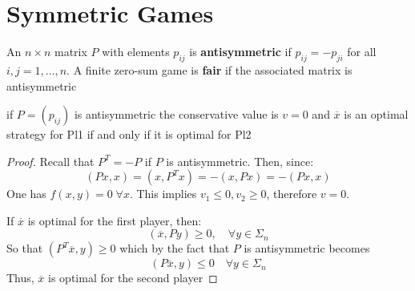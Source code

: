 \documentclass[../main.tex]{subfiles}
\begin{document}
\section{Symmetric Games}
\begin{definition}
    An $n \times n$ matrix $P$ with elements $p_{ij}$ is \textbf{antisymmetric} if $p_{ij} = - p_{ji}$ for all $i,j = 1,\ldots,n$. A finite zero-sum game is \textbf{fair} if the associated matrix is antisymmetric
\end{definition}

\begin{proposition}
    if $P = (p_{ij})$ is antisymmetric the conservative value is $v = 0$ and $\overline{x}$ is an optimal strategy for Pl1 if and only if it is optimal for Pl2
\end{proposition}

\begin{proof}
    Recall that  $P^T = - P$ if $P$ is antisymmetric. Then, since:
    \[
        (Px,x) = (x, P^T x) = - (x, Px) = -(Px,x)
    \]
    One has $f(x,y)=0 \; \forall x$. This implies $v_1 \leq 0, v_2 \geq 0$, therefore $v = 0$.

    If $\overline{x}$ is optimal for the first player, then:
    \[
        (\overline{x}, Py) \geq 0, \quad \forall y \in \Sigma_n
    \]
    So that $(P^T \overline{x}, y) \geq 0$ which by the fact that $P$ is antisymmetric becomes
    \[
        (P \overline{x}, y) \leq 0 \quad \forall y \in \Sigma_n
    \]
    Thus, $\overline{x}$ is optimal for the second player
\end{proof}
\end{document}
